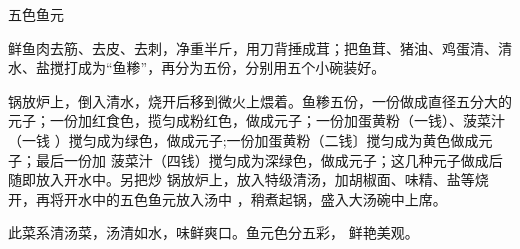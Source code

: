 \begin{recipe}[五福鱼元]{五色鱼元}

\ingredients


\preparation

\step 鲜鱼肉去筋、去皮、去刺，净重半斤，用刀背捶成茸；把鱼茸、猪油、鸡蛋清、清
水、盐搅打成为“鱼糁”，再分为五份，分别用五个小碗装好。

\step 锅放炉上，倒入清水，烧开后移到微火上煨着。鱼糁五份，一份做成直径五分大的
元子；一份加红食色，揽匀成粉红色，做成元子；一份加蛋黄粉（一钱）、菠菜汁（一钱
）搅匀成为绿色，做成元子;一份加蛋黄粉（二钱〕搅匀成为黄色做成元子；最后一份加
菠菜汁（四钱）搅匀成为深绿色，做成元子；这几种元子做成后随即放入开水中。另把炒
锅放炉上，放入特级清汤，加胡椒面、味精、盐等烧开，再将开水中的五色鱼元放入汤中
，稍煮起锅，盛入大汤碗中上席。

\features

此菜系清汤菜，汤清如水，味鲜爽口。鱼元色分五彩， 鲜艳美观。

\end{recipe}

